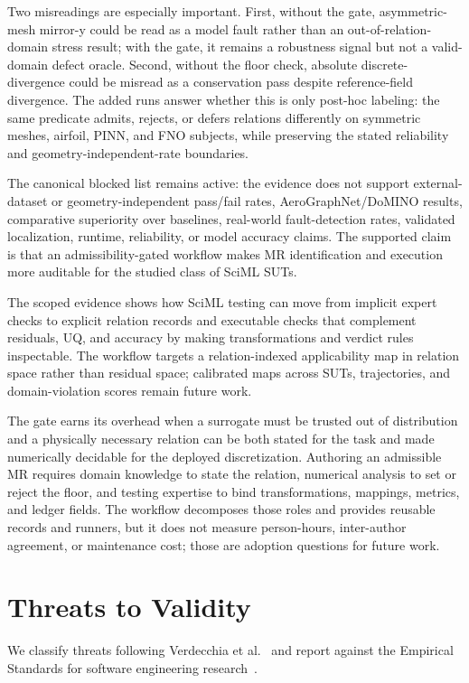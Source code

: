\documentclass[preprint,12pt]{elsarticle}
\begin{document}
Two misreadings are especially important. First, without the gate, asymmetric-mesh mirror-y could be read as a model fault rather than an out-of-relation-domain stress result; with the gate, it remains a robustness signal but not a valid-domain defect oracle. Second, without the floor check, absolute discrete-divergence could be misread as a conservation pass despite reference-field divergence. The added runs answer whether this is only post-hoc labeling: the same predicate admits, rejects, or defers relations differently on symmetric meshes, airfoil, PINN, and FNO subjects, while preserving the stated reliability and geometry-independent-rate boundaries.

The canonical blocked list remains active: the evidence does not support external-dataset or geometry-independent pass/fail rates, AeroGraphNet/DoMINO results, comparative superiority over baselines, real-world fault-detection rates, validated localization, runtime, reliability, or model accuracy claims. The supported claim is that an admissibility-gated workflow makes MR identification and execution more auditable for the studied class of SciML SUTs.

The scoped evidence shows how SciML testing can move from implicit expert checks to explicit relation records and executable checks that complement residuals, UQ, and accuracy by making transformations and verdict rules inspectable. The workflow targets a relation-indexed applicability map in relation space rather than residual space; calibrated maps across SUTs, trajectories, and domain-violation scores remain future work.

The gate earns its overhead when a surrogate must be trusted out of distribution and a physically necessary relation can be both stated for the task and made numerically decidable for the deployed discretization. Authoring an admissible MR requires domain knowledge to state the relation, numerical analysis to set or reject the floor, and testing expertise to bind transformations, mappings, metrics, and ledger fields. The workflow decomposes those roles and provides reusable records and runners, but it does not measure person-hours, inter-author agreement, or maintenance cost; those are adoption questions for future work.

\section{Threats to Validity}
\label{sec:threats}

We classify threats following Verdecchia et al.~\citep{verdecchia2023threats} and report against the Empirical Standards for software engineering research~\citep{ralph2021empirical}.
\end{document}
